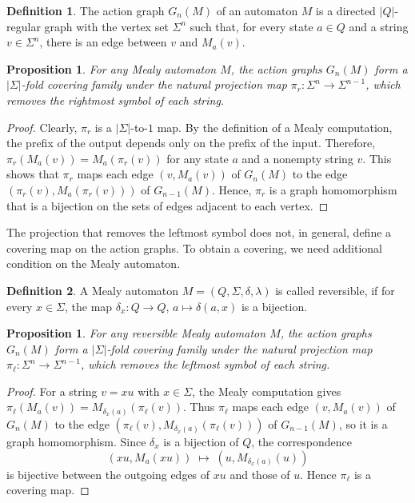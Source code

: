 \documentclass[12pt]{article}
\newtheorem{proposition}[theorem]{Proposition}
\theoremstyle{definition}
\newtheorem{definition}{Definition}
\begin{document}
\begin{definition}
The action graph $G_n(M)$ of an automaton $M$ is a directed $|Q|$-regular graph with the vertex set $\Sigma^n$ such that, for every state $a\in Q$ and a string $v\in\Sigma^n$, there is an edge between $v$ and $M_a(v)$.
\end{definition}

\begin{proposition}
For any Mealy automaton $M$, the action graphs $G_n(M)$ form a $|\Sigma|$-fold covering family under the natural projection map $\pi_r:\Sigma^{n}\rightarrow\Sigma^{n-1}$, which removes the rightmost symbol of each string.
\end{proposition}
\begin{proof}
Clearly, $\pi_r$ is a $|\Sigma|$-to-$1$ map. By the definition of a Mealy computation, the prefix of the output depends only on the prefix of the input. Therefore, $\pi_r(M_a(v))=M_a(\pi_r(v))$ for any state $a$ and a nonempty string $v$. This shows that $\pi_r$ maps each edge $(v,M_a(v))$ of $G_{n}(M)$ to the edge $(\pi_r(v),M_a(\pi_r(v)))$ of $G_{n-1}(M)$. Hence, $\pi_r$ is a graph homomorphism that is a bijection on the sets of edges adjacent to each vertex.
\end{proof}

The projection that removes the leftmost symbol does not, in general, define a covering map on the action graphs. To obtain a covering, we need additional condition on the Mealy automaton.

\begin{definition}
A Mealy automaton $M=(Q,\Sigma,\delta,\lambda)$ is called reversible, if for every $x\in\Sigma$, the map $\delta_x:Q\rightarrow Q$, $a\mapsto \delta(a,x)$ is a bijection.
\end{definition}

\begin{proposition}
For any reversible Mealy automaton $M$, the action graphs $G_n(M)$ form a $|\Sigma|$-fold covering family under the natural projection map $\pi_\ell:\Sigma^n\to\Sigma^{n-1}$, which removes the leftmost symbol of each string.
\end{proposition}
\begin{proof}
For a string $v=xu$ with $x\in\Sigma$, the Mealy computation gives
$\pi_\ell(M_a(v))=M_{\delta_x(a)}(\pi_\ell(v))$.
Thus $\pi_\ell$ maps each edge $(v,M_a(v))$ of $G_n(M)$ to the edge $(\pi_\ell(v),M_{\delta_x(a)}(\pi_\ell(v)))$ of $G_{n-1}(M)$, so it is a graph homomorphism.
Since $\delta_x$ is a bijection of $Q$, the correspondence
\[
(xu,M_a(xu)) \;\longmapsto\; (u,M_{\delta_x(a)}(u))
\]
is bijective between the outgoing edges of $xu$ and those of $u$.
Hence $\pi_\ell$ is a covering map.
\end{proof}
\end{document}
